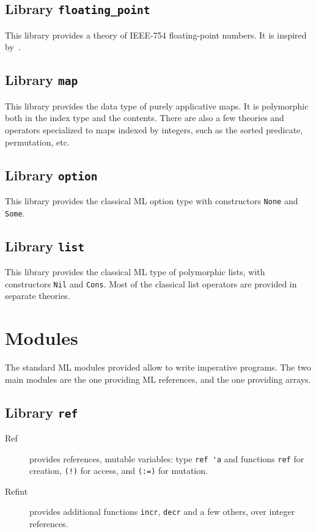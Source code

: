 \subsection{Library \texttt{floating\_point}}

This library provides a theory of IEEE-754 floating-point numbers. It
is inspired by~\cite{ayad10ijcar}.

\subsection{Library \texttt{map}}

This library provides the data type of purely applicative maps. It is
polymorphic both in the index type and the contents. There are also a
few theories and operators specialized to maps indexed by integers,
such as the sorted predicate, permutation, etc.

\subsection{Library \texttt{option}}

This library provides the classical ML option type with constructors
\verb|None| and \verb|Some|.

\subsection{Library \texttt{list}}

This library provides the classical ML type of polymorphic lists, with
constructors \verb|Nil| and \verb|Cons|. Most of the classical list
operators are provided in separate theories.

\section{Modules}
\label{sec:mllibrary}

The standard ML modules provided allow to write imperative
programs. The two main modules are the one providing ML references,
and the one providing arrays.

\subsection{Library \texttt{ref}}


\begin{description}
\item[Ref] provides references, \ie mutable variables:
  type \verb|ref 'a| and functions \verb|ref| for creation,
  \verb|(!)| for access, and \verb|(:=)| for mutation.
\item[Refint] provides additional functions \texttt{incr},
  \texttt{decr} and a few others, over integer references.
\end{description}
\indextt{:=}

